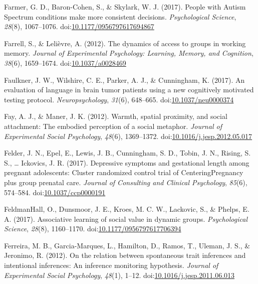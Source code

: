 \documentclass[english,man]{apa6}
\theoremstyle{definition}
\theoremstyle{definition}
\theoremstyle{definition}
\theoremstyle{remark}
\begin{document}
\hypertarget{ref-Farmer2017}{}
Farmer, G. D., Baron-Cohen, S., \& Skylark, W. J. (2017). People with
Autism Spectrum conditions make more consistent decisions.
\emph{Psychological Science}, \emph{28}(8), 1067--1076.
doi:\href{https://doi.org/10.1177/0956797617694867}{10.1177/0956797617694867}

\hypertarget{ref-Farrell2012}{}
Farrell, S., \& Lelièvre, A. (2012). The dynamics of access to groups in
working memory. \emph{Journal of Experimental Psychology: Learning,
Memory, and Cognition}, \emph{38}(6), 1659--1674.
doi:\href{https://doi.org/10.1037/a0028469}{10.1037/a0028469}

\hypertarget{ref-Faulkner2017}{}
Faulkner, J. W., Wilshire, C. E., Parker, A. J., \& Cunningham, K.
(2017). An evaluation of language in brain tumor patients using a new
cognitively motivated testing protocol. \emph{Neuropsychology},
\emph{31}(6), 648--665.
doi:\href{https://doi.org/10.1037/neu0000374}{10.1037/neu0000374}

\hypertarget{ref-Fay2012}{}
Fay, A. J., \& Maner, J. K. (2012). Warmth, spatial proximity, and
social attachment: The embodied perception of a social metaphor.
\emph{Journal of Experimental Social Psychology}, \emph{48}(6),
1369--1372.
doi:\href{https://doi.org/10.1016/j.jesp.2012.05.017}{10.1016/j.jesp.2012.05.017}

\hypertarget{ref-Felder2017a}{}
Felder, J. N., Epel, E., Lewis, J. B., Cunningham, S. D., Tobin, J. N.,
Rising, S. S., \ldots{} Ickovics, J. R. (2017). Depressive symptoms and
gestational length among pregnant adolescents: Cluster randomized
control trial of CenteringPregnancy plus group prenatal care.
\emph{Journal of Consulting and Clinical Psychology}, \emph{85}(6),
574--584.
doi:\href{https://doi.org/10.1037/ccp0000191}{10.1037/ccp0000191}

\hypertarget{ref-FeldmanHall2017}{}
FeldmanHall, O., Dunsmoor, J. E., Kroes, M. C. W., Lackovic, S., \&
Phelps, E. A. (2017). Associative learning of social value in dynamic
groups. \emph{Psychological Science}, \emph{28}(8), 1160--1170.
doi:\href{https://doi.org/10.1177/0956797617706394}{10.1177/0956797617706394}

\hypertarget{ref-Ferreira2012}{}
Ferreira, M. B., Garcia-Marques, L., Hamilton, D., Ramos, T., Uleman, J.
S., \& Jeronimo, R. (2012). On the relation between spontaneous trait
inferences and intentional inferences: An inference monitoring
hypothesis. \emph{Journal of Experimental Social Psychology},
\emph{48}(1), 1--12.
doi:\href{https://doi.org/10.1016/j.jesp.2011.06.013}{10.1016/j.jesp.2011.06.013}
\end{document}
